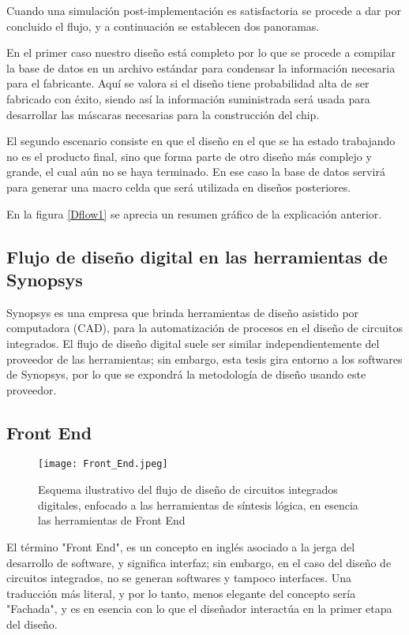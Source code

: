 Cuando una simulación post-implementación es satisfactoria se procede a dar por concluido el flujo, y a continuación se establecen dos panoramas.

En el primer caso nuestro diseño está completo por lo que se procede a compilar la base de datos en un archivo estándar para condensar la información necesaria para el fabricante. Aquí se valora si el diseño tiene probabilidad alta de ser fabricado con éxito, siendo así la información suministrada será usada para desarrollar las máscaras necesarias para la construcción del chip.

El segundo escenario consiste en que el diseño en el que se ha estado trabajando no es el producto final, sino que forma parte de otro diseño más complejo y grande, el cual aún no se haya terminado. En ese caso la base de datos servirá para generar una macro celda que será utilizada en diseños posteriores.

En la figura \ref{Dflow1} se aprecia un resumen gráfico de la explicación anterior.

\subsection{Flujo de diseño digital en las herramientas de Synopsys}

Synopsys es una empresa que brinda herramientas de diseño asistido por computadora (CAD), para la automatización de procesos en el diseño de circuitos integrados. El flujo de diseño digital suele ser similar independientemente del proveedor de las herramientas; sin embargo, esta tesis gira entorno a los softwares de Synopsys, por lo que se expondrá la metodología de diseño usando este proveedor.

\subsection{Front End}

\begin{figure}[h]
\texttt{[image: Front\_End.jpeg]}
\centering
\caption{Esquema ilustrativo del flujo de diseño de circuitos integrados digitales, enfocado a las herramientas de síntesis lógica, en esencia las herramientas de Front End}
\label{fe}
\end{figure}


El término "Front End", es un concepto en inglés asociado a la jerga del desarrollo de software, y significa interfaz; sin embargo, en el caso del diseño de circuitos integrados, no se generan softwares y tampoco interfaces. Una traducción más literal, y por lo tanto, menos elegante del concepto sería "Fachada", y es en esencia con lo que el diseñador interactúa en la primer etapa del diseño.

